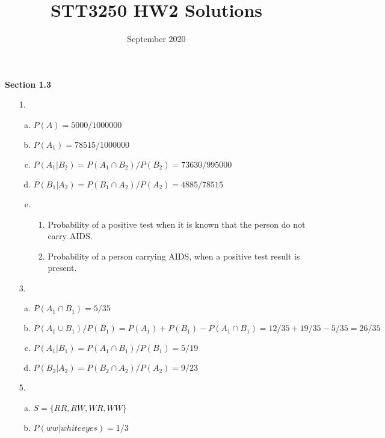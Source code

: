 \documentclass{article}\usepackage[]{graphicx}\usepackage[]{color}
\title{STT3250 HW2 Solutions}
\date{September 2020}
\begin{document}
\maketitle


\noindent
\textbf{Section 1.3}

\begin{itemize}

\item [1.]

\begin{enumerate}[(a)]
    \item $P(A) = 5000/1000000$
    
    \item $P(A_1) = 78515/1000000$
    
    \item $P(A_1|B_2) = P(A_1 \cap B_2)/P(B_2) = 73630/995000$
    
    \item $P(B_1|A_2) = P(B_1 \cap A_2)/P(A_2) = 4885/78515$
    
    \item \begin{enumerate}[(1)]
        \item Probability of a positive test when it is known that the person do not carry AIDS.
        \item Probability of a person carrying AIDS, when a positive test result is present.
    \end{enumerate}
\end{enumerate}




\item [3.]\begin{enumerate}[(a)]
    \item $P(A_1 \cap B_1) = 5/35$
    \item $P(A_1 \cup B_1)/P(B_1) = P(A_1) + P(B_1) - P(A_1 \cap B_1) = 12/35+19/35-5/35 = 26/35 $
    
    \item $P(A_1|B_1) = P(A_1 \cap B_1)/P(B_1) = 5/19$
    
    \item $P(B_2|A_2) = P(B_2 \cap A_2)/P(A_2) = 9/23$
\end{enumerate}

\item [5.] \begin{enumerate}[(a)]
    \item $S = \{RR, RW, WR, WW\}$
    \item $P(ww|white eyes) = 1/3$
\end{enumerate}


\end{itemize}
\end{document}
